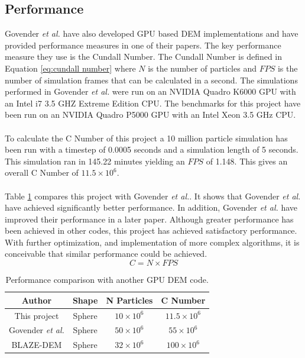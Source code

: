 \documentclass[a4paper,11pt,titlepage]{report}
\begin{document}
\subsection{Performance}
Govender \textit{et al.} have also developed GPU based DEM implementations and have provided performance measures in one of their papers\cite{performance}. The key performance measure they use is the Cundall Number. The Cundall Number is defined in Equation \ref{eq:cundall number} where $N$ is the number of particles and $FPS$ is the number of simulation frames that can be calculated in a second. The simulations performed in Govender \textit{et al.}\cite{performance} were run on an NVIDIA Quadro K6000 GPU with an Intel i7 3.5 GHZ Extreme Edition CPU. The benchmarks for this project have been run on an NVIDIA Quadro P5000 GPU with an  Intel Xeon 3.5 GHz CPU.
\\\\To calculate the C Number of this project a 10 million particle simulation has been run with a timestep of 0.0005 seconds and a simulation length of 5 seconds. This simulation ran in 145.22 minutes yielding an $FPS$ of 1.148. This gives an overall C Number of $11.5 \times 10^6$.
\\\\Table \ref{tab:performance comparison} compares this project with Govender \textit{et al.}\cite{performance}. It shows that Govender \textit{et al.} have achieved significantly better performance. In addition, Govender \textit{et al.} have improved their performance in a later paper\cite{blazedem}. Although greater performance has been achieved in other codes, this project has achieved satisfactory performance. With further optimization, and implementation of more complex algorithms, it is conceivable that similar performance could be achieved.
\begin{equation}
C = N \times FPS
\label{eq:cundall number}
\end{equation}
\begin{table}[!ht]
\begin{center}
\begin{tabular}{|c c c c|}
\hline
Author & Shape & N Particles & C Number\\
\hline
This project & Sphere & $10 \times 10^6$ & $11.5 \times 10^6$ \\
Govender \textit{et al.}\cite{performance} & Sphere & $50 \times 10^6$ & $55 \times 10^6$ \\
BLAZE-DEM\cite{blazedem} & Sphere & $32 \times 10^6$ & $100 \times 10^6$ \\
\hline
\end{tabular}
\end{center}
\caption{Performance comparison with another GPU DEM code.}
\label{tab:performance comparison}
\end{table}
\end{document}
